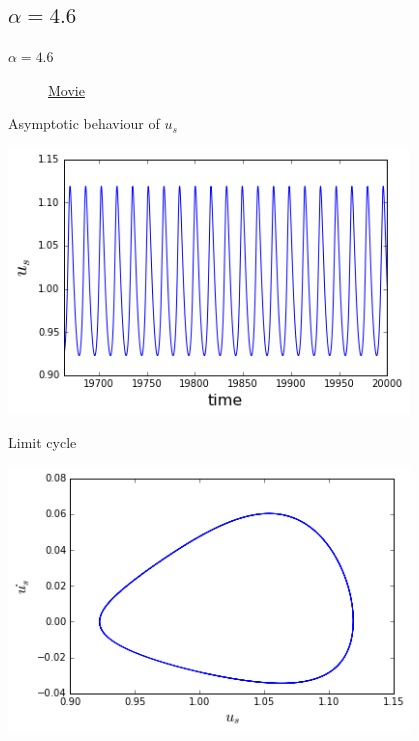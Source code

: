 \documentclass{beamer}
\begin{document}
\subsection{$\alpha = 4.6$}
\begin{frame}{$\alpha = 4.6$}
	\begin{figure}[h!]
\href{https://www.youtube.com/watch?v=iHq0bfq4zdk}{Movie} 
	\end{figure} 
\end{frame}
\begin{frame}{Asymptotic behaviour of $u_s$}
	\begin{center}
		\includegraphics[height=200pt]{46}\\
		
	\end{center}	
\end{frame}
\begin{frame}{Limit cycle}
	\begin{center}
		\includegraphics[height=200pt]{lim46}\\
		
	\end{center}	
\end{frame}
\end{document}

